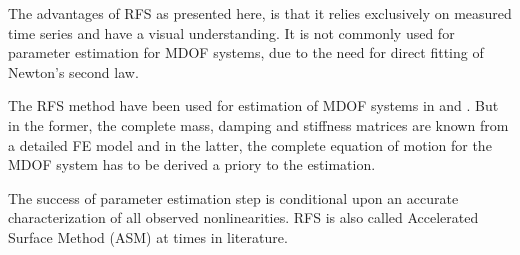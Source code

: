 The advantages of RFS as presented here, is that it relies exclusively on measured
time series and have a visual understanding. It is not commonly used for
parameter estimation for MDOF systems, due to the need for direct fitting of
Newton's second law.

The RFS method have been used for estimation of MDOF systems in
\autocite{dossogne2015a} and \autocite[chap. 1.5.1]{noel2014_phd}. But in the
former, the complete mass, damping and stiffness matrices are known from a
detailed FE model and in the latter, the complete equation of motion for the
MDOF system has to be derived a priory to the estimation.

The success of parameter estimation step is conditional upon an accurate
characterization of all observed nonlinearities.
RFS is also called Accelerated Surface Method (ASM) at times in literature.



